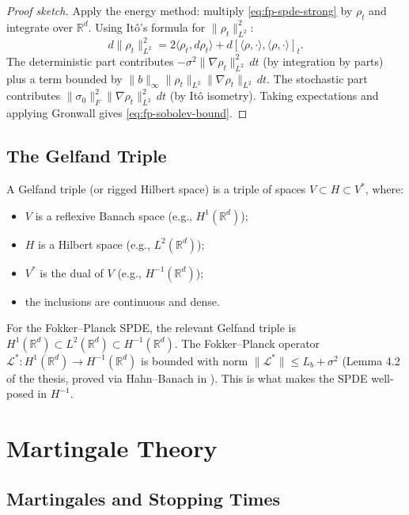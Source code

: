 \begin{proof}[Proof sketch]
Apply the energy method: multiply \eqref{eq:fp-spde-strong} by $\rho_t$ and integrate
over $\mathbb{R}^d$. Using It\^o's formula for $\|\rho_t\|_{L^2}^2$:
\[
    d\|\rho_t\|_{L^2}^2 = 2\langle \rho_t, d\rho_t \rangle + d[\langle\rho,\cdot\rangle,
    \langle\rho,\cdot\rangle]_t.
\]
The deterministic part contributes $-\sigma^2 \|\nabla\rho_t\|_{L^2}^2\, dt$ (by
integration by parts) plus a term bounded by
$\|b\|_\infty \|\rho_t\|_{L^2} \|\nabla\rho_t\|_{L^2}\, dt$. The stochastic part
contributes $\|\sigma_0\|_F^2 \|\nabla\rho_t\|_{L^2}^2\, dt$ (by It\^o isometry). Taking
expectations and applying Gronwall gives \eqref{eq:fp-sobolev-bound}.
\end{proof}

\subsection{The Gelfand Triple}

\begin{definition}
A Gelfand triple (or rigged Hilbert space) is a triple of spaces
$V \subset H \subset V^*$, where:
\begin{itemize}
    \item $V$ is a reflexive Banach space (e.g., $H^1(\mathbb{R}^d)$);
    \item $H$ is a Hilbert space (e.g., $L^2(\mathbb{R}^d)$);
    \item $V^*$ is the dual of $V$ (e.g., $H^{-1}(\mathbb{R}^d)$);
    \item the inclusions are continuous and dense.
\end{itemize}
\end{definition}

For the Fokker--Planck SPDE, the relevant Gelfand triple is
$H^1(\mathbb{R}^d) \subset L^2(\mathbb{R}^d) \subset H^{-1}(\mathbb{R}^d)$. The
Fokker--Planck operator $\mathcal{L}^* : H^1(\mathbb{R}^d) \to H^{-1}(\mathbb{R}^d)$ is
bounded with norm $\|\mathcal{L}^*\| \leq L_b + \sigma^2$ (Lemma 4.2 of the thesis,
proved via Hahn--Banach in ). This is what makes the SPDE
well-posed in $H^{-1}$.


\section{Martingale Theory}
\label{sec:mp-martingale}

\subsection{Martingales and Stopping Times}

